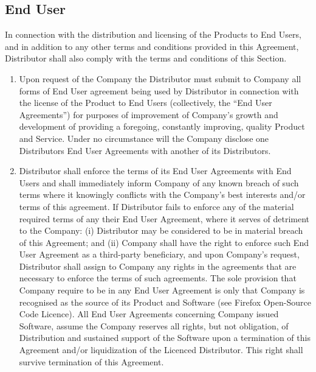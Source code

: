 \documentclass[letterpaper,10pt,english]{sphinxmanual}
\begin{document}
\subsection{End User}
\label{\detokenize{distributionandpackaging:end-user}}
In connection with the distribution and licensing of the Products to End Users, and in addition to any other terms and conditions provided in this Agreement, Distributor shall also comply with the terms and conditions of this Section.
\begin{enumerate}
\item {} 
Upon request of the Company the Distributor must submit to Company all forms of End User agreement being used by Distributor in connection with the license of the Product to End Users (collectively, the “End User Agreements”) for purposes of improvement of Company’s growth and development of providing a foregoing, constantly improving, quality Product and Service. Under no circumstance will the Company  disclose one Distributors End User Agreements with another of its Distributors.

\item {} 
Distributor shall enforce the terms of its End User Agreements with End Users and shall immediately inform Company of any known breach of such terms where it knowingly conflicts with the Company’s best interests and/or terms of this agreement. If Distributor fails to enforce any of the material required terms of any their End User Agreement, where it serves of detriment to the Company: (i) Distributor may be considered to be in material breach of this Agreement; and (ii) Company shall have the right to enforce such End User Agreement as a third-party beneficiary, and upon Company’s request, Distributor shall assign to Company any rights in the agreements that are necessary to enforce the terms of such agreements. The sole provision that Company require to be in any End User Agreement is only that Company is recognised as the source of its Product and Software (see Firefox Open-Source Code Licence). All End User Agreements concerning Company issued Software, assume the Company reserves all rights, but not obligation, of Distribution and sustained support of the Software upon a termination of this Agreement and/or liquidization of the Licenced Distributor. This right shall survive termination of this Agreement.

\end{enumerate}
\end{document}
